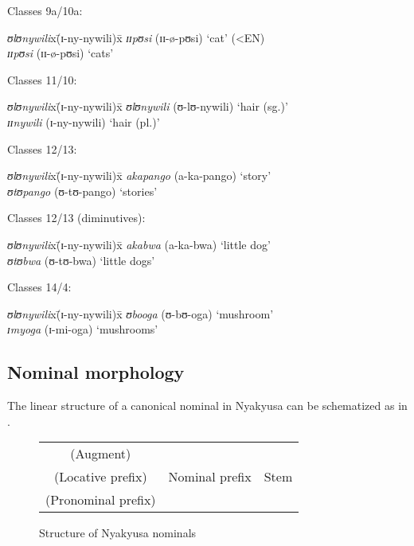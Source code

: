 \begin{exe}
\begin{xlist}
\ex Classes 9a/10a:
\begin{tabbing}
\textit{ʊlʊnywili}x\=(\degree ɪ-ny-nywili)x\=\kill %
\textit{ɪɪpʊsi} \> (\degree ɪɪ-ø-pʊsi) \> \lq cat' (<EN)\\
\textit{ɪɪpʊsi} \> (\degree ɪɪ-ø-pʊsi) \> \lq cats'
\end{tabbing}
\ex Classes 11/10:
\begin{tabbing}
\textit{ʊlʊnywili}x\=(\degree ɪ-ny-nywili)x\=\kill %
\textit{ʊlʊnywili} \> (\degree ʊ-lʊ-nywili) \> \lq hair (sg.)'\\
\textit{ɪɪnywili} \> (\degree ɪ-ny-nywili) \> \lq hair (pl.)'
\end{tabbing}
\ex Classes 12/13:
\begin{tabbing}
\textit{ʊlʊnywili}x\=(\degree ɪ-ny-nywili)x\=\kill %
\textit{akapango} \> (\degree a-ka-pango) \> \lq story'\\
\textit{ʊtʊpango} \> (\degree ʊ-tʊ-pango) \> \lq stories'
\end{tabbing}
\ex Classes 12/13 (diminutives):
\begin{tabbing}
\textit{ʊlʊnywili}x\=(\degree ɪ-ny-nywili)x\=\kill %
\textit{akabwa} \> (\degree a-ka-bwa) \> \lq little dog'\\
\textit{ʊtʊbwa} \> (\degree ʊ-tʊ-bwa) \> \lq little dogs'
\end{tabbing}
\ex Classes 14/4:
\begin{tabbing}
\textit{ʊlʊnywili}x\=(\degree ɪ-ny-nywili)x\=\kill %
\textit{ʊbooga} \> (\degree ʊ-bʊ-oga) \> \lq mushroom'\\
\textit{ɪmyoga} \> (\degree ɪ-mi-oga) \> \lq mushrooms'
\end{tabbing}
\end{xlist}	
\end{exe}

\subsection{Nominal morphology}\label{NominalMorphology}
The linear structure of a canonical nominal in Nyakyusa can be schematized as in .
\begin{figure}[H] %
	\centering
	\begin{tabularx}{8cm}{ccc}
		\hline 
		(Augment) & \multirow{3}{*}{Nominal prefix} & \multirow{3}{*}{Stem} \\ 
		(Locative prefix)  &  & \\(Pronominal prefix) & &\\ 
		\hline 
	\end{tabularx}
	\caption{Structure of Nyakyusa nominals}
	\label{FigureStructureNominals} 
\end{figure} 

